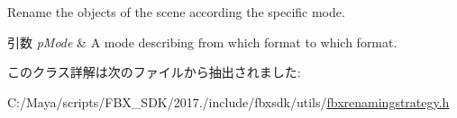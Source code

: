 Rename the objects of the scene according the specific mode. 
\begin{DoxyParams}{引数}
{\em p\+Mode} & A mode describing from which format to which format. \\
\hline
\end{DoxyParams}


このクラス詳解は次のファイルから抽出されました\+:\begin{DoxyCompactItemize}
\item 
C\+:/\+Maya/scripts/\+F\+B\+X\+\_\+\+S\+D\+K/2017./include/fbxsdk/utils/\hyperlink{fbxrenamingstrategy_8h}{fbxrenamingstrategy.\+h}\end{DoxyCompactItemize}
